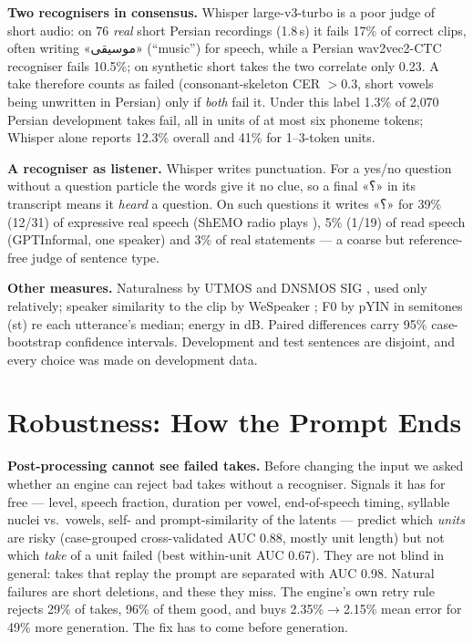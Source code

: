 \documentclass[conference]{IEEEtran}
\newcommand{\fa}[1]{{\persianfont\beginR #1\endR}}
\newcommand{\RES}[1]{#1}
\begin{document}
\textbf{Two recognisers in consensus.} Whisper large-v3-turbo \cite{whisper2023} is a poor judge of short
audio: on \RES{76} \emph{real} short Persian recordings (\RES{1.8}\,s) it fails \RES{17\%} of correct clips,
often writing \fa{«موسیقی»} (``music'') for speech, while a Persian wav2vec2-CTC recogniser fails \RES{10.5\%};
on synthetic short takes the two correlate only \RES{0.23}. A take therefore counts as failed (consonant-skeleton
CER $>0.3$, short vowels being unwritten in Persian) only if \emph{both} fail it. Under this label
\RES{1.3\%} of \RES{2{,}070} Persian development takes fail, all in units of at most six phoneme tokens;
Whisper alone reports \RES{12.3\%} overall and \RES{41\%} for 1--3-token units.

\textbf{A recogniser as listener.} Whisper writes punctuation. For a yes/no question without a question
particle the words give it no clue, so a final \fa{«؟»} in its transcript means it \emph{heard} a question.
On such questions it writes \fa{«؟»} for \RES{39\%} (\RES{12/31}) of expressive real speech (ShEMO radio plays
\cite{shemo2019}), \RES{5\%} (\RES{1/19}) of read speech (GPTInformal, one speaker) and \RES{3\%} of real
statements --- a coarse but reference-free judge of sentence type.

\textbf{Other measures.} Naturalness by UTMOS \cite{utmos2022} and DNSMOS SIG \cite{dnsmos2022}, used only
relatively; speaker similarity to the clip by WeSpeaker \cite{wespeaker2023}; F0 by pYIN \cite{pyin2014} in
semitones (st) re each utterance's median; energy in dB. Paired differences carry 95\% case-bootstrap
confidence intervals. Development and test sentences are disjoint, and every choice was made on development
data.

\section{Robustness: How the Prompt Ends}\label{sec:robust}
\textbf{Post-processing cannot see failed takes.} Before changing the input we asked whether an engine can
reject bad takes without a recogniser. Signals it has for free --- level, speech fraction, duration per
vowel, end-of-speech timing, syllable nuclei vs.\ vowels, self- and prompt-similarity of the latents ---
predict which \emph{units} are risky (case-grouped cross-validated AUC \RES{0.88}, mostly unit length) but not
which \emph{take} of a unit failed (best within-unit AUC \RES{0.67}). They are not blind in general: takes
that replay the prompt are separated with AUC \RES{0.98}. Natural failures are short deletions, and these
they miss. The engine's own retry rule rejects \RES{29\%} of takes, \RES{96\%} of them good, and buys
\RES{2.35\%$\to$2.15\%} mean error for \RES{49\%} more generation. The fix has to come before generation.
\end{document}
